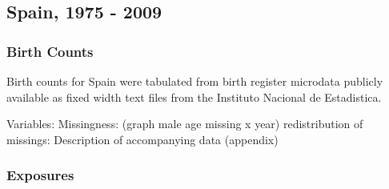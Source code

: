 
\subsection{Spain, 1975 - 2009}
\subsubsection{Birth Counts}
Birth counts for Spain were tabulated from birth register microdata publicly
available as fixed width text files from the Instituto Nacional de
Estadistica\citep{MNPnacimientos}.

Variables: 
Missingness: (graph male age missing x year)
redistribution of missings:
Description of accompanying data (appendix)


\subsubsection{Exposures}


     